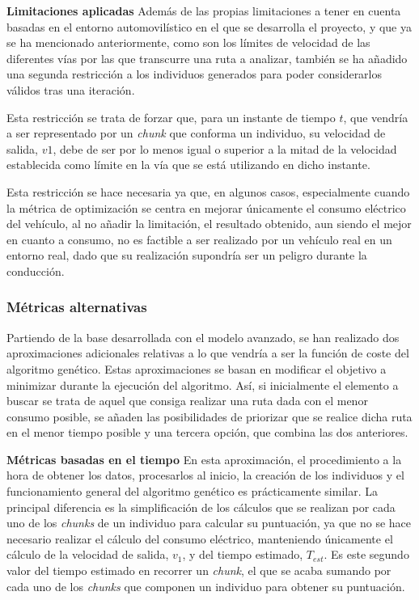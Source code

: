 \documentclass[11pt,spanish,listoffigures,listoftables]{tfgetsinf}
\begin{document}
\noindent\textbf{Limitaciones aplicadas}\newline
Además de las propias limitaciones a tener en cuenta basadas en el entorno automovilístico en el que se desarrolla el proyecto, y que ya se ha mencionado anteriormente, como son los límites de velocidad de las diferentes vías por las que transcurre una ruta a analizar, también se ha añadido una segunda restricción a los individuos generados para poder considerarlos válidos tras una iteración.

Esta restricción se trata de forzar que, para un instante de tiempo $t$, que vendría a ser representado por un \textit{chunk} que conforma un individuo, su velocidad de salida, $v1$, debe de ser por lo menos igual o superior a la mitad de la velocidad establecida como límite en la vía que se está utilizando en dicho instante.

Esta restricción se hace necesaria ya que, en algunos casos, especialmente cuando la métrica de optimización se centra en mejorar únicamente el consumo eléctrico del vehículo, al no añadir la limitación, el resultado obtenido, aun siendo el mejor en cuanto a consumo, no es factible a ser realizado por un vehículo real en un entorno real, dado que su realización supondría ser un peligro durante la conducción.

\subsubsection{Métricas alternativas}
\label{section:adv_alt_models}
Partiendo de la base desarrollada con el modelo avanzado, se han realizado dos aproximaciones adicionales relativas a lo que vendría a ser la función de coste del algoritmo genético. Estas aproximaciones se basan en modificar el objetivo a minimizar durante la ejecución del algoritmo. Así, si inicialmente el elemento a buscar se trata de aquel que consiga realizar una ruta dada con el menor consumo posible, se añaden las posibilidades de priorizar que se realice dicha ruta en el menor tiempo posible y una tercera opción, que combina las dos anteriores.\newline

\noindent\textbf{Métricas basadas en el tiempo}\newline
En esta aproximación, el procedimiento a la hora de obtener los datos, procesarlos al inicio, la creación de los individuos y el funcionamiento general del algoritmo genético es prácticamente similar. La principal diferencia es la simplificación de los cálculos que se realizan por cada uno de los \textit{chunks} de un individuo para calcular su puntuación, ya que no se hace necesario realizar el cálculo del consumo eléctrico, manteniendo únicamente el cálculo de la velocidad de salida, $v_{1}$, y del tiempo estimado, $T_{est}$. Es este segundo valor del tiempo estimado en recorrer un \textit{chunk}, el que se acaba sumando por cada uno de los \textit{chunks} que componen un individuo para obtener su puntuación.
\end{document}
